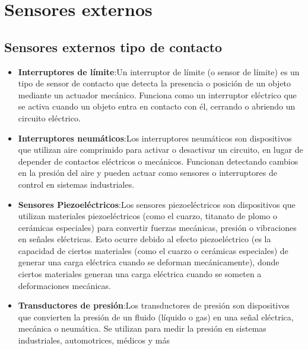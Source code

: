\section{Sensores externos}
\subsection{Sensores externos tipo de contacto}

\begin{itemize}
	\item \textbf{Interruptores de límite}:Un interruptor de límite (o sensor de límite) es un tipo de sensor de contacto que detecta la presencia o posición de un objeto mediante un actuador mecánico. Funciona como un interruptor eléctrico que se activa cuando un objeto entra en contacto con él, cerrando o abriendo un circuito eléctrico.

	\item \textbf{Interruptores neumáticos}:Los interruptores neumáticos son dispositivos que utilizan aire comprimido para activar o desactivar un circuito, en lugar de depender de contactos eléctricos o mecánicos. Funcionan detectando cambios en la presión del aire y pueden actuar como sensores o interruptores de control en sistemas industriales.

	\item \textbf{Sensores Piezoeléctricos}:Los sensores piezoeléctricos son dispositivos que utilizan materiales piezoeléctricos (como el cuarzo, titanato de plomo o cerámicas especiales) para convertir fuerzas mecánicas, presión o vibraciones en señales eléctricas. Esto ocurre debido al efecto piezoeléctrico (es la capacidad de ciertos materiales (como el cuarzo o cerámicas especiales) de generar una carga eléctrica cuando se deforman mecánicamente), donde ciertos materiales generan una carga eléctrica cuando se someten a deformaciones mecánicas.\newpage

	\item \textbf{Transductores de presión}:Los transductores de presión son dispositivos que convierten la presión de un fluido (líquido o gas) en una señal eléctrica, mecánica o neumática. Se utilizan para medir la presión en sistemas industriales, automotrices, médicos y más
	
\end{itemize}

